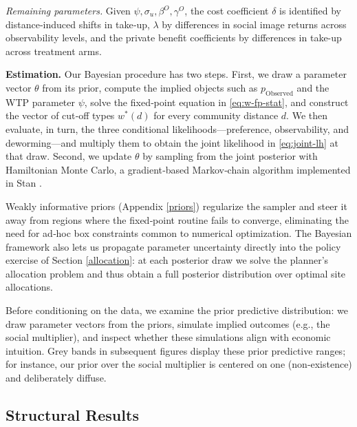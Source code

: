 \documentclass[12pt,a4paper]{article}
\begin{document}
\emph{Remaining parameters.}  
Given \(\psi,\sigma_{u},\beta^{O},\gamma^{O}\), the cost coefficient \(\delta\) is identified by distance‑induced shifts in take‑up, \(\lambda\) by differences in social image returns across observability levels, and the private benefit coefficients by differences in take-up across treatment arms.


\textbf{Estimation.}  
Our Bayesian procedure has two steps.  
First, we draw a parameter vector \(\theta\) from its prior, compute the implied objects such as \(p_{\text{Observed}}\) and the WTP parameter \(\psi\), solve the fixed‑point equation in \eqref{eq:w-fp-stat}, and construct the vector of cut‑off types \(w^{\ast}(d)\) for every community distance \(d\). We then evaluate, in turn, the three conditional likelihoods—preference, observability, and deworming—and multiply them to obtain the joint likelihood in \eqref{eq:joint-lh} at that draw. Second, we update $\theta$ by sampling from the joint posterior with Hamiltonian Monte Carlo, a gradient‑based Markov‑chain algorithm implemented in Stan \citep{stan}.

Weakly informative priors (Appendix \ref{priors}) regularize the sampler and steer it away from regions where the fixed‑point routine fails to converge, eliminating the need for ad‑hoc box constraints common to numerical optimization. The Bayesian framework also lets us propagate parameter uncertainty directly into the policy exercise of Section \ref{allocation}: at each posterior draw we solve the planner’s allocation problem and thus obtain a full posterior distribution over optimal site allocations.

Before conditioning on the data, we examine the prior predictive distribution: we draw parameter vectors from the priors, simulate implied outcomes (e.g., the social multiplier), and inspect whether these simulations align with economic intuition. Grey bands in subsequent figures display these prior predictive ranges; for instance, our prior over the social multiplier is centered on one (non‑existence) and deliberately diffuse.

\subsection{Structural Results}
\end{document}

